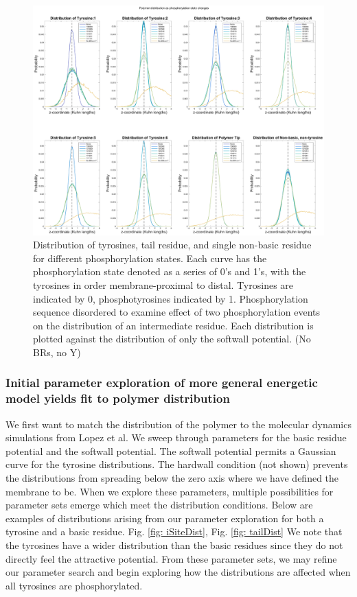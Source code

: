 \documentclass[../../AdvancementSummary.tex]{subfiles}
\begin{document}
\begin{figure}[H]
\begin{center}
\includegraphics[width=\linewidth]{ResultsFigures/CD3ZetaSoftwallPiecewiseBasicsY/Phosphorylation/iSiteDistribution135624.eps}
\end{center}
\caption{Distribution of tyrosines, tail residue, and single non-basic residue for different phosphorylation states. Each curve has the phosphorylation state denoted as a series of 0's and 1's, with the tyrosines in order membrane-proximal to distal. Tyrosines are indicated by 0, phosphotyrosines indicated by 1. Phosphorylation sequence disordered to examine effect of two phosphorylation events on the distribution of an intermediate residue. Each distribution is plotted against the distribution of only the softwall potential. (No BRs, no Y) \label{fig: Dist135624}}
\end{figure}

\subsubsection{Initial parameter exploration of more general energetic model yields fit to polymer distribution}

We first want to match the distribution of the polymer to the molecular dynamics simulations from Lopez et al. We sweep through parameters for the basic residue potential and the softwall potential. The softwall potential permits a Gaussian curve for the tyrosine distributions.  The hardwall condition (not shown) prevents the distributions from spreading below the zero axis where we have defined the membrane to be. When we explore these parameters, multiple possibilities for parameter sets emerge which meet the distribution conditions. Below are examples of distributions arising from our parameter exploration for both a tyrosine and a basic residue. Fig. \ref{fig: iSiteDist}, Fig. \ref{fig: tailDist} We note that the tyrosines have a wider distribution than the basic residues since they do not directly feel the attractive potential. From these parameter sets, we may refine our parameter search and begin exploring how the distributions are affected when all tyrosines are phosphorylated. 
\end{document}
